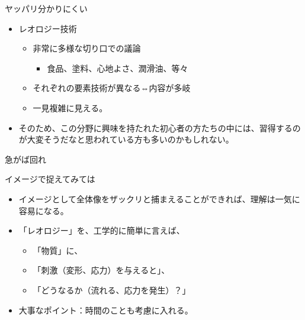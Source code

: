 \begin{frame}

\begin{block}{ヤッパリ分かりにくい}

\begin{itemize}
\tightlist
\item
  レオロジー技術

  \begin{itemize}
  \tightlist
  \item
    非常に多様な切り口での議論

    \begin{itemize}
    \tightlist
    \item
      食品、塗料、心地よさ、潤滑油、等々
    \end{itemize}
  \item
    それぞれの要素技術が異なる⇔内容が多岐
  \item
    一見複雑に見える。
  \end{itemize}
\item
  そのため、この分野に興味を持たれた初心者の方たちの中には、習得するのが大変そうだなと思われている方も多いのかもしれない。
\end{itemize}

\end{block}

\end{frame}

\begin{frame}{急がば回れ}
\protect\hypertarget{ux6025ux304cux3070ux56deux308c}{}

\end{frame}

\begin{frame}

\begin{block}{イメージで捉えてみては}

\begin{itemize}
\tightlist
\item
  イメージとして全体像をザックリと捕まえることができれば、理解は一気に容易になる。
\item
  「レオロジー」を、工学的に簡単に言えば、

  \begin{itemize}
  \tightlist
  \item
    「物質」に、
  \item
    「刺激（変形、応力）を与えると」、
  \item
    「どうなるか（流れる、応力を発生）？」
  \end{itemize}
\item
  {大事なポイント：時間のことも考慮に入れる。}
\end{itemize}

\end{block}

\end{frame}


